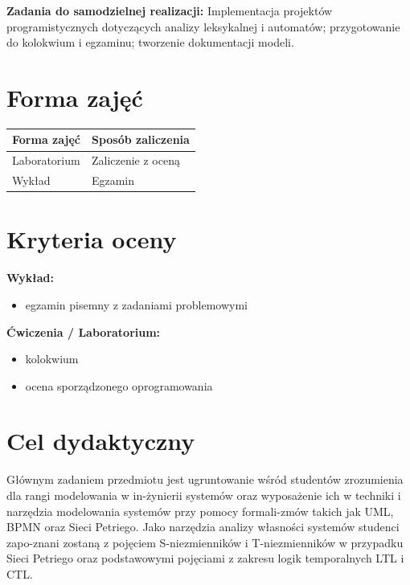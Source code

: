 \documentclass[12pt, a4paper]{article}
\newcommand{\thdrule}{\noalign{\global\setlength{\extrarowheight}{0pt}}}
\newcommand{\thdend}{\noalign{\global\setlength{\extrarowheight}{3pt}}}
\begin{document}
\vspace{4pt}
\noindent\textbf{Zadania do samodzielnej realizacji:} Implementacja projektów programistycznych dotyczących analizy leksykalnej i automatów; przygotowanie do kolokwium i egzaminu; tworzenie dokumentacji modeli.

\section{Forma zajęć}

\begin{center}
{\scriptsize
\begin{tabular}{m{5cm}m{8cm}}
\thdrule\toprule
\rowcolor{pjatkRed} {\color{white}\textbf{Forma zajęć}} & {\color{white}\textbf{Sposób zaliczenia}} \\
\midrule\thdend
  \rowcolor{tableRowLight} Laboratorium & Zaliczenie z oceną \\
  \rowcolor{tableRowAlt} Wykład & Egzamin \\
\bottomrule
\end{tabular}}
\end{center}

\section{Kryteria oceny}

\textbf{Wykład:}
\begin{itemize}
  \item egzamin pisemny z zadaniami problemowymi
\end{itemize}
\vspace{4pt}
\textbf{Ćwiczenia / Laboratorium:}
\begin{itemize}
  \item kolokwium
  \item ocena sporządzonego oprogramowania
\end{itemize}


\section{Cel dydaktyczny}

Głównym zadaniem przedmiotu jest ugruntowanie wśród studentów zrozumienia dla rangi modelowania w in-żynierii systemów oraz wyposażenie ich w techniki i narzędzia modelowania systemów przy pomocy formali-zmów takich jak UML, BPMN oraz Sieci Petriego. Jako narzędzia analizy własności systemów studenci zapo-znani zostaną z pojęciem S-niezmienników i T-niezmienników w przypadku Sieci Petriego oraz podstawowymi pojęciami z zakresu logik temporalnych LTL i CTL.
\end{document}
